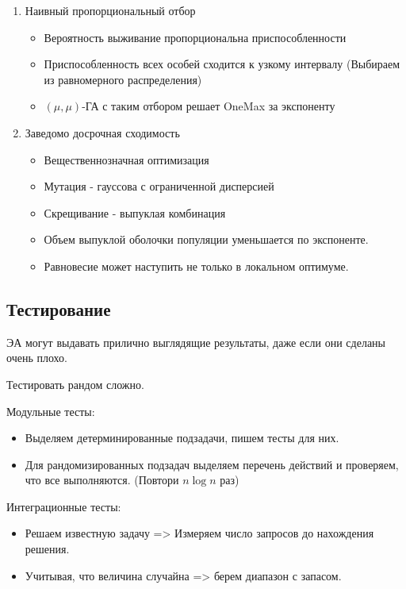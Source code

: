 \begin{enumerate}
    \item Наивный пропорциональный отбор
    \begin{itemize}
        \item Вероятность выживание пропорциональна приспособленности
        \item Приспособленность всех особей сходится к узкому интервалу
        (Выбираем из равномерного распределения)
        \item $(\mu, \mu)$-ГА с таким отбором решает OneMax за экспоненту
    \end{itemize}
    \item Заведомо досрочная сходимость
    \begin{itemize}
        \item Вещественнозначная оптимизация
        \item Мутация - гауссова с ограниченной дисперсией
        \item Скрещивание - выпуклая комбинация
        \item Объем выпуклой оболочки популяции уменьшается
        по экспоненте.
        \item Равновесие может наступить не только в локальном
        оптимуме.
    \end{itemize}
\end{enumerate}

\subsection*{Тестирование}

ЭА могут выдавать прилично выглядящие результаты, даже если
они сделаны очень плохо.

Тестировать рандом сложно.

Модульные тесты:
\begin{itemize}
    \item Выделяем детерминированные подзадачи, пишем тесты для них.
    \item Для рандомизированных подзадач выделяем перечень действий
    и проверяем, что все выполняются. (Повтори $n\log n$ раз)
\end{itemize}

Интеграционные тесты:
\begin{itemize}
    \item Решаем известную задачу => Измеряем число запросов
    до нахождения решения.
    \item Учитывая, что величина случайна => берем диапазон с
    запасом.
\end{itemize}